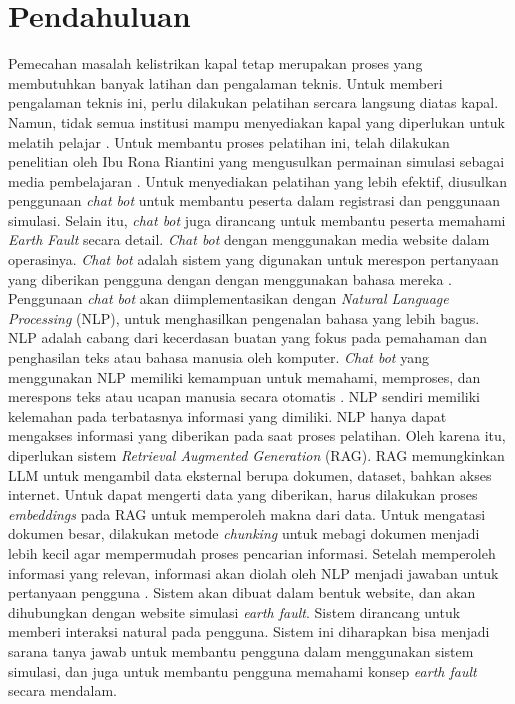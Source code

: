 \section{Pendahuluan}
\label{sec:pendahuluan}


Pemecahan masalah kelistrikan kapal tetap merupakan proses yang membutuhkan banyak latihan dan pengalaman teknis. Untuk memberi pengalaman teknis ini, perlu dilakukan pelatihan sercara langsung diatas kapal. Namun, tidak semua institusi mampu menyediakan kapal yang diperlukan untuk melatih pelajar
. Untuk membantu proses pelatihan ini, telah dilakukan penelitian oleh Ibu Rona Riantini yang mengusulkan permainan simulasi sebagai media pembelajaran \cite{riantini2022serious}. Untuk menyediakan pelatihan yang lebih efektif, diusulkan penggunaan \emph{chat bot} untuk membantu peserta dalam registrasi dan penggunaan simulasi. Selain itu, \emph{chat bot} juga  dirancang untuk membantu peserta memahami \emph{Earth Fault} secara detail. \emph{Chat bot} dengan menggunakan media website dalam operasinya. \emph{Chat bot} adalah sistem yang digunakan untuk merespon pertanyaan yang diberikan pengguna dengan dengan menggunakan bahasa mereka \cite{9501523}. Penggunaan \emph{chat bot} akan diimplementasikan dengan \emph{Natural Language Processing} (NLP),  untuk menghasilkan pengenalan bahasa yang lebih bagus. NLP adalah cabang dari kecerdasan buatan yang fokus pada pemahaman dan penghasilan teks atau bahasa manusia oleh komputer. \emph{Chat bot} yang menggunakan NLP memiliki kemampuan untuk memahami, memproses, dan merespons teks atau ucapan manusia secara otomatis \cite{9402401}. NLP sendiri memiliki kelemahan pada terbatasnya informasi yang dimiliki. NLP hanya dapat mengakses informasi yang diberikan pada saat proses pelatihan. Oleh karena itu, diperlukan sistem \emph{Retrieval Augmented Generation} (RAG). RAG memungkinkan LLM untuk mengambil data eksternal berupa dokumen, dataset, bahkan akses internet. Untuk dapat mengerti data yang diberikan, harus dilakukan proses \emph{embeddings} pada RAG untuk memperoleh makna dari data. Untuk mengatasi dokumen besar, dilakukan metode \emph{chunking} untuk mebagi dokumen menjadi lebih kecil agar mempermudah proses pencarian informasi. Setelah memperoleh informasi yang relevan, informasi akan diolah oleh NLP menjadi jawaban untuk pertanyaan pengguna \cite{10448015}. Sistem akan dibuat dalam bentuk website, dan akan dihubungkan dengan website simulasi \emph{earth fault}. Sistem dirancang untuk memberi interaksi natural pada pengguna. Sistem ini diharapkan bisa menjadi sarana tanya jawab untuk membantu pengguna dalam menggunakan sistem simulasi, dan juga untuk membantu pengguna memahami konsep \emph{earth fault} secara mendalam. 

